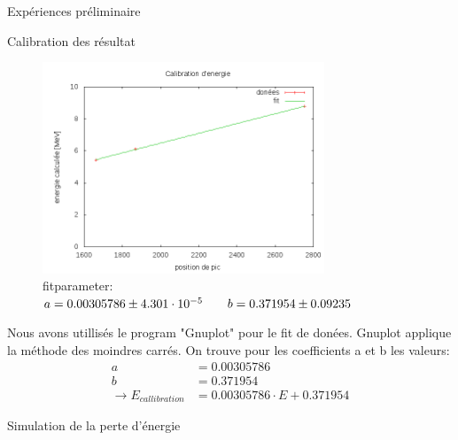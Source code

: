 \documentclass[a4paper,11pt]{scrartcl}
\begin{document}
\begin{section}{Expériences préliminaire}
\begin{subsection}{Calibration des résultat}
\begin{figure}
\begin{center}
   \includegraphics[width=0.75\textwidth]{Bilder/calibration.png}
\caption[calibration d'energie]{fitparameter: $ a = 0.00305786  \pm 4.301\cdot 10^{-5} \hspace{2 em} b = 0.371954  \pm 0.09235$ }
  \end{center}
\end{figure}
  \end{subsection}
  Nous avons utillisés le program "Gnuplot" pour le fit de donées. Gnuplot applique la méthode des moindres carrés. On trouve pour les coefficients a et b les valeurs:
\begin{align*}
a&= 0.00305786 \\
b&= 0.371954 \\
\rightarrow E_{callibration} &= 0.00305786  \cdot E +0.371954 
\end{align*}

  \begin{subsection}{Simulation de la perte d'énergie}
  \end{subsection}
 \end{section}
\end{document}
